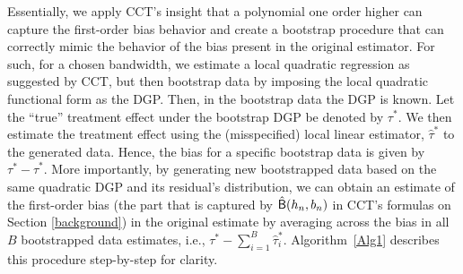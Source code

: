 \documentclass[12pt,fleqn]{article}
\begin{document}
Essentially, we apply CCT's insight that a polynomial one order higher can capture the first-order bias behavior and create a bootstrap procedure that can correctly mimic the behavior of the bias present in the original estimator. For such, for a chosen bandwidth, we estimate a local quadratic regression as suggested by CCT, but then bootstrap data by imposing the local quadratic functional form as the DGP. Then, in the bootstrap data the DGP is known. Let the ``true'' treatment effect under the bootstrap DGP be denoted by $\tau^{*}$. We then estimate the treatment effect using the (misspecified) local linear estimator, $\hat{\tau}^{*}$ to the generated data. Hence, the bias for a specific bootstrap data is given by $\tau^{*}-\hat{\tau}^{*}$. More importantly, by generating new bootstrapped data based on the same quadratic DGP and its residual's distribution, we can obtain an estimate of the first-order bias (the part that is captured by $\hat{\mathsf{B}}(h_{n},b_{n})$ in CCT's formulas on Section \ref{background}) in the original estimate by averaging across the bias in all $B$ bootstrapped data estimates, i.e., $\tau^{*} - \sum_{i = 1}^{B} \hat{\tau}_{ i}^{*}$. Algorithm~\ref{Alg1} describes this procedure step-by-step for clarity.
\end{document}
